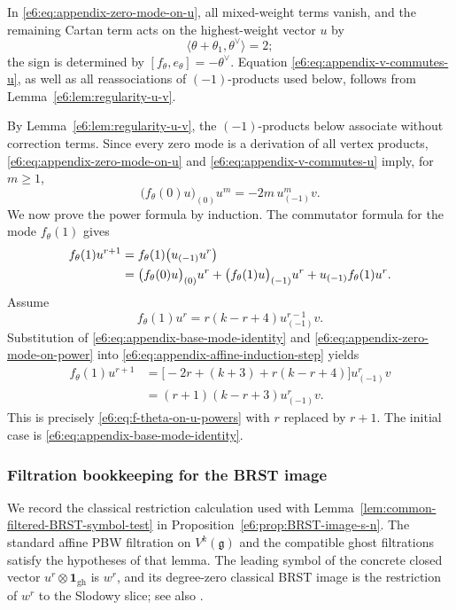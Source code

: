 \documentclass[11pt,reqno]{amsart}
\theoremstyle{definition}
\theoremstyle{remark}
\begin{document}
In \eqref{e6:eq:appendix-zero-mode-on-u}, all mixed-weight terms vanish, and the
remaining Cartan term acts on the highest-weight vector \(u\) by
\[
  \langle\theta+\theta_1,\theta^\vee\rangle=2;
\]
the sign is determined by \([f_\theta,e_\theta]=-\theta^\vee\).
Equation \eqref{e6:eq:appendix-v-commutes-u}, as well as all reassociations of
$(-1)$-products used below, follows from
Lemma~\ref{e6:lem:regularity-u-v}.

By Lemma~\ref{e6:lem:regularity-u-v}, the $(-1)$-products below associate
without correction terms.  Since every
zero mode is a derivation of all vertex products,
\eqref{e6:eq:appendix-zero-mode-on-u} and
\eqref{e6:eq:appendix-v-commutes-u} imply, for \(m\geq1\),
\begin{equation}\label{e6:eq:appendix-zero-mode-on-power}
  \bigl(f_\theta(0)u\bigr)_{(0)}u^m
  =-2m\,u^m_{(-1)}v.
\end{equation}
We now prove the power formula by induction.  The commutator formula for the mode
\(f_\theta(1)\) gives
\begin{align}
 f_\theta(1)u^{r+1}
 &=f_\theta(1)\bigl(u_{(-1)}u^r\bigr)\notag\\
 &=\bigl(f_\theta(0)u\bigr)_{(0)}u^r
   +\bigl(f_\theta(1)u\bigr)_{(-1)}u^r
   +u_{(-1)}f_\theta(1)u^r.
 \label{e6:eq:appendix-affine-induction-step}
\end{align}
Assume
\[
  f_\theta(1)u^r=r(k-r+4)u^{r-1}_{(-1)}v.
\]
Substitution of \eqref{e6:eq:appendix-base-mode-identity} and
\eqref{e6:eq:appendix-zero-mode-on-power} into
\eqref{e6:eq:appendix-affine-induction-step} yields
\begin{align*}
 f_\theta(1)u^{r+1}
 &=\bigl[-2r+(k+3)+r(k-r+4)\bigr]u^r_{(-1)}v\\
 &=(r+1)(k-r+3)u^r_{(-1)}v.
\end{align*}
This is precisely \eqref{e6:eq:f-theta-on-u-powers} with \(r\) replaced by
\(r+1\).  The initial case is
\eqref{e6:eq:appendix-base-mode-identity}.

\subsubsection{Filtration bookkeeping for the BRST image}
\label{e6:app:BRST-filtration-bookkeeping}

We record the classical restriction calculation used with
Lemma~\ref{lem:common-filtered-BRST-symbol-test} in
Proposition~\ref{e6:prop:BRST-image-s-n}.  The standard affine PBW filtration
on $V^k(\mathfrak g)$ and the compatible ghost filtrations satisfy the
hypotheses of that lemma.  The leading symbol of the concrete closed vector
$u^r\otimes\mathbf1_{\mathrm{gh}}$ is $w^r$, and its degree-zero classical
BRST image is the restriction of $w^r$ to the Slodowy slice; see also
\cite{DeSoleKac2006,GanGinzburg2002}.
\end{document}
